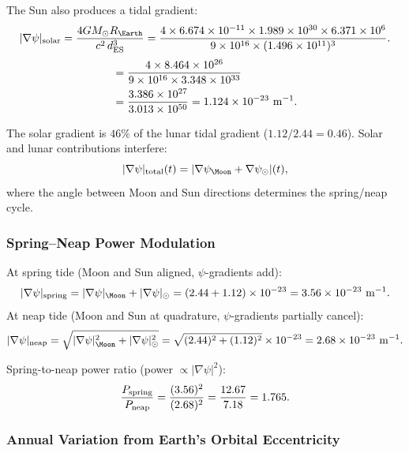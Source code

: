 \documentclass[aps,prd,twocolumn,superscriptaddress]{revtex4-2}
\begin{document}
The Sun also produces a tidal gradient:
\begin{equation}
|\nabla\psi|_{\rm solar} = \frac{4GM_\odot R_\Earth}{c^2\,d_{\rm ES}^3}
= \frac{4\times 6.674\times 10^{-11}\times 1.989\times 10^{30}
\times 6.371\times 10^6}{9\times 10^{16}\times(1.496\times 10^{11})^3}.
\end{equation}
\begin{align}
&= \frac{4\times 8.464\times 10^{26}}{9\times 10^{16}\times 3.348\times 10^{33}} \notag\\
&= \frac{3.386\times 10^{27}}{3.013\times 10^{50}}
= 1.124\times 10^{-23}~\mathrm{m^{-1}}.
\end{align}

The solar gradient is $46\%$ of the lunar tidal gradient
($1.12/2.44 = 0.46$).  Solar and lunar contributions interfere:
\begin{equation}
|\nabla\psi|_{\rm total}(t) = |\nabla\psi_\Moon + \nabla\psi_\odot|(t),
\end{equation}
where the angle between Moon and Sun directions determines the
spring/neap cycle.

\subsubsection{Spring--Neap Power Modulation}

At spring tide (Moon and Sun aligned, $\psi$-gradients add):
\begin{equation}
|\nabla\psi|_{\rm spring} = |\nabla\psi|_\Moon + |\nabla\psi|_\odot
= (2.44 + 1.12)\times 10^{-23} = 3.56\times 10^{-23}~\mathrm{m^{-1}}.
\end{equation}
At neap tide (Moon and Sun at quadrature, $\psi$-gradients partially cancel):
\begin{equation}
|\nabla\psi|_{\rm neap} = \sqrt{|\nabla\psi|_\Moon^2 + |\nabla\psi|_\odot^2}
= \sqrt{(2.44)^2 + (1.12)^2}\times 10^{-23} = 2.68\times 10^{-23}~\mathrm{m^{-1}}.
\end{equation}

Spring-to-neap power ratio (power $\propto |\nabla\psi|^2$):
\begin{equation}
\frac{P_{\rm spring}}{P_{\rm neap}}
= \frac{(3.56)^2}{(2.68)^2} = \frac{12.67}{7.18} = 1.765.
\end{equation}

\subsubsection{Annual Variation from Earth's Orbital Eccentricity}
\end{document}
